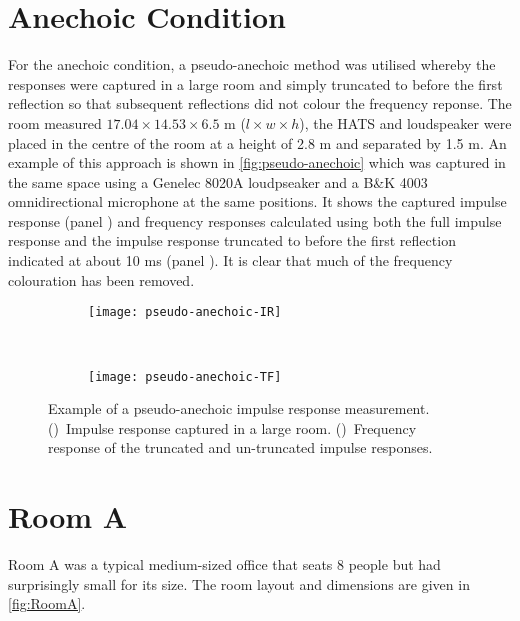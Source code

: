 \section{Anechoic Condition}

For the anechoic condition, a pseudo-anechoic method was utilised whereby the responses were captured in a large room and simply truncated to before the first reflection so that subsequent reflections did not colour the frequency reponse.  The room measured $17.04 \times 14.53 \times 6.5$ m ($l \times w \times h$), the HATS and loudspeaker were placed in the centre of the room at a height of 2.8 m and separated by 1.5 m.  An example of this approach is shown in \autoref{fig:pseudo-anechoic} which was captured in the same space using a Genelec 8020A loudpseaker and a B\&K 4003 omnidirectional microphone at the same positions. It shows the captured impulse response (panel ) and frequency responses calculated using both the full impulse response and the impulse response truncated to before the first reflection indicated at about 10 ms (panel ).  It is clear that much of the frequency colouration has been removed.

\begin{figure}
\centering
	\begin{subfigure}{5.3in}
		\texttt{[image: pseudo-anechoic-IR]}
		\caption[Impulse Response]{}\label{fig:pseudo-anechoic-IR}
		\vspace{2ex}
	\end{subfigure}
\\
	\begin{subfigure}{5.3in}
		\texttt{[image: pseudo-anechoic-TF]}
		\caption[Frequency Response]{}\label{fig:pseudo-anechoic-TF}
	\end{subfigure}
\caption[Example of a pseudo-anechoic impulse response measurement]{Example of a pseudo-anechoic impulse response measurement.
()~Impulse response captured in a large room.
()~Frequency response of the truncated and un-truncated impulse responses.} 
\label{fig:pseudo-anechoic}
\end{figure}

\section{Room A}

Room A was a typical medium-sized office that seats 8 people but had surprisingly small \RT{} for its size.  The room layout and dimensions are given in \autoref{fig:RoomA}.



